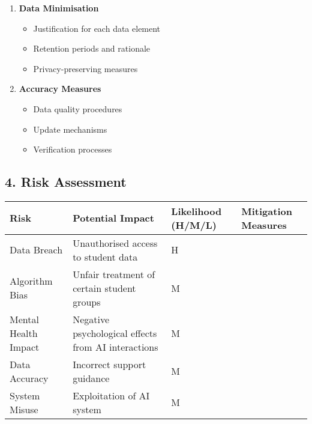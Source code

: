 \documentclass[14pt,a4paper]{article}
\begin{document}
\begin{multicols}{2}
\begin{enumerate}
  \item \textbf{Data Minimisation}
\begin{itemize}
    \item Justification for each data element
    \item Retention periods and rationale
    \item Privacy-preserving measures
\end{itemize}
  \item \textbf{Accuracy Measures}
    \begin{itemize}
        \item Data quality procedures
        \item Update mechanisms
        \item Verification processes
    \end{itemize}
\end{enumerate}

\end{multicols}

\subsection*{4. Risk Assessment}
\begin{longtable}{|p{3cm}|p{4cm}|p{3cm}|p{3cm}|}
    \hline
    \textbf{Risk} & \textbf{Potential Impact} & \textbf{Likelihood (H/M/L)} & \textbf{Mitigation Measures} \\
    \hline
    Data Breach & Unauthorised access to student data & H &  \\
    \hline
    Algorithm Bias & Unfair treatment of certain student groups & M &  \\
    \hline
    Mental Health Impact & Negative psychological effects from AI interactions & M &  \\
    \hline
    Data Accuracy & Incorrect support guidance & M &  \\
    \hline
    System Misuse & Exploitation of AI system & M &  \\
    \hline
\end{longtable}
\end{document}
